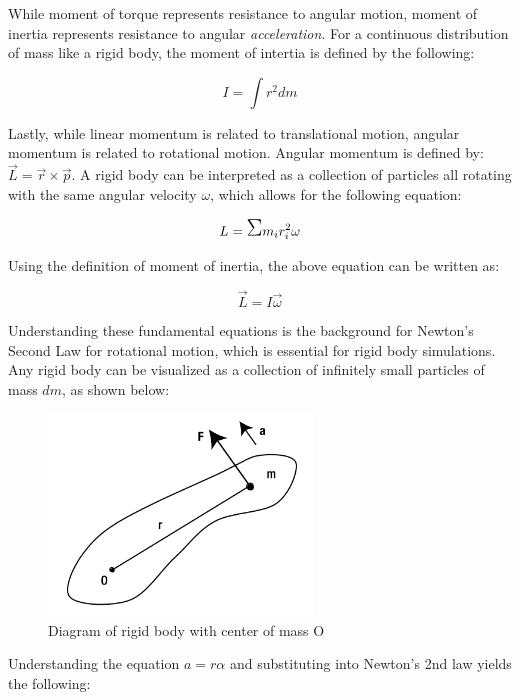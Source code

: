 While moment of torque represents resistance to angular motion, moment of inertia represents resistance to angular \textit{acceleration}.  For a continuous distribution of mass like a rigid body, the moment of intertia is defined by the following:

\begin{equation}\label{momentofintertia}
I =   \int  r^2 dm
\end{equation}

Lastly, while linear momentum is related to translational motion, angular momentum is related to rotational motion.  Angular momentum is defined by:  $\vec{L} = \vec{r} \times \vec{p}$.  A rigid body can be interpreted as a collection of particles all rotating with the same angular velocity $\omega$, which allows for the following equation:

\begin{equation}
L = \mathlarger{\mathlarger{\mathlarger{\Sigma}}} m_i r_i^2 \omega
\end{equation}

Using the definition of moment of inertia, the above equation can be written as:

\begin{equation}
\vec{L} = I \vec{\omega}
\end{equation}

Understanding these fundamental equations is the background for Newton's Second Law for rotational motion, which is essential for rigid body simulations.  Any rigid body can be visualized as a collection of infinitely small particles of mass $dm$, as shown below:

\begin{figure}[h] 
	\centering
		\includegraphics[width=7cm]{Figures/rigidbody.png}

	\caption{Diagram of rigid body with center of mass O}
	\label{fig:rigidbody}
\end{figure}

Understanding the equation $a = r \alpha$ and substituting into Newton's 2nd law yields the following:


